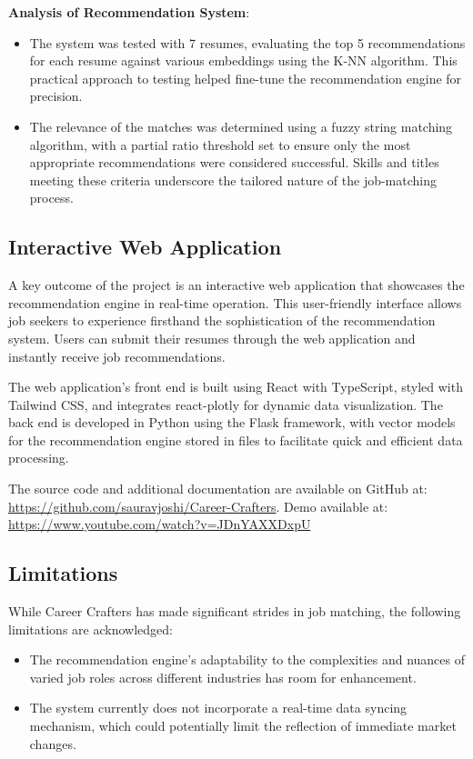 \documentclass[a4paper,10pt]{article}
\begin{document}
\textbf{Analysis of Recommendation System}:
\begin{itemize}
 \item The system was tested with 7 resumes, evaluating the top 5 recommendations for each resume against various embeddings using the K-NN algorithm. This practical approach to testing helped fine-tune the recommendation engine for precision.

 \item The relevance of the matches was determined using a fuzzy string matching algorithm, with a partial ratio threshold set to ensure only the most appropriate recommendations were considered successful. Skills and titles meeting these criteria underscore the tailored nature of the job-matching process.

\end{itemize}

\subsection{Interactive Web Application}

A key outcome of the project is an interactive web application that showcases the recommendation engine in real-time operation. This user-friendly interface allows job seekers to experience firsthand the sophistication of the recommendation system. Users can submit their resumes through the web application and instantly receive job recommendations.

The web application's front end is built using React with TypeScript, styled with Tailwind CSS, and integrates react-plotly for dynamic data visualization. The back end is developed in Python using the Flask framework, with vector models for the recommendation engine stored in files to facilitate quick and efficient data processing.

The source code and additional documentation are available on GitHub at: \href{https://github.com/sauravjoshi/Career-Crafters}{https://github.com/sauravjoshi/Career-Crafters}. Demo available at: \url{https://www.youtube.com/watch?v=JDnYAXXDxpU}

\subsection{Limitations}
While Career Crafters has made significant strides in job matching, the following limitations are acknowledged:
\begin{itemize}
  \item The recommendation engine's adaptability to the complexities and nuances of varied job roles across different industries has room for enhancement.
  \item The system currently does not incorporate a real-time data syncing mechanism, which could potentially limit the reflection of immediate market changes.
\end{itemize}
\end{document}
